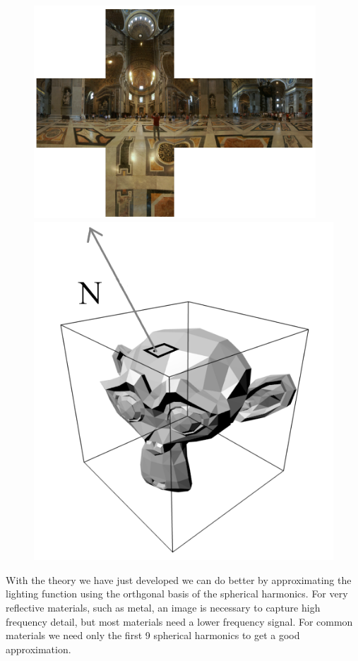 \documentclass{article}
\theoremstyle{definition}
\theoremstyle{definition}
\begin{document}
\begin{figure}[h]
    \includegraphics[scale=0.30]{cubemap}
    \includegraphics[scale=0.35]{cube-function}
    \centering
\end{figure}

With the theory we have just developed we can do better by approximating the lighting function using the orthgonal basis of the spherical harmonics. For very reflective materials, such as metal, an image is necessary to capture high frequency detail, but most materials need a lower frequency signal. For common materials we need only the first 9 spherical harmonics to get a good approximation. \cite{sh-lighting}
\end{document}
